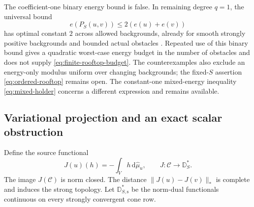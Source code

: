 \documentclass[11pt,a4paper]{article}
\newcommand{\MathEqref}[1]{{\hypersetup{linkcolor=EquationLink}\eqref{#1}}}
\theoremstyle{definition}
\theoremstyle{remark}
\numberwithin{equation}{section}
\newcommand{\dd}{\mathrm d}
\newcommand{\C}{\mathscr C}
\begin{document}
The coefficient-one binary energy bound is false.  In remaining degree
$q=1$, the universal bound
\begin{equation}
                  e(P_S(u,v))\le2(e(u)+e(v))
                         \label{eq:binary-rooftop}
\end{equation}
has optimal constant $2$ across allowed backgrounds, already for
smooth strongly positive backgrounds and bounded actual obstacles
\cite{Rooftop}.  Repeated use of this binary bound gives a quadratic
worst-case energy budget in the number of obstacles and does not
supply \MathEqref{eq:finite-rooftop-budget}.  The counterexamples also
exclude an energy-only modulus uniform over changing backgrounds;
the fixed-$S$ assertion \MathEqref{eq:ordered-rooftop} remains open.
The constant-one mixed-energy inequality
\MathEqref{eq:mixed-holder} concerns a different expression and
remains available.

\subsection{Variational projection and an exact scalar obstruction}

Define the source functional
\begin{equation}
 J(u)(h)=-\int_Vh\,\dd\widehat\mu_u,
                   \qquad J:\C\longrightarrow\mathbb D_S^*.
                         \label{eq:source-map}
\end{equation}
The image $J(\C)$ is norm closed.  The distance
$\|J(u)-J(v)\|_*$ is complete and induces the strong topology.
Let $\mathbb D_{S,\mathrm s}^*$ be the norm-dual functionals
continuous on every strongly convergent cone row.
\end{document}
